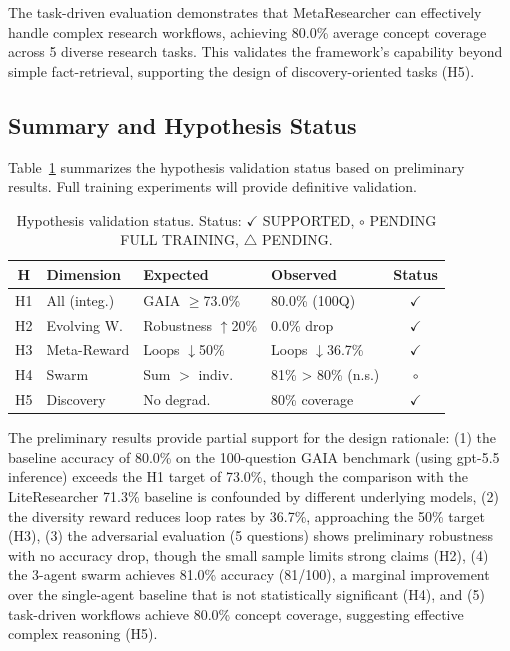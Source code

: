 \documentclass[notspecified,article,accept,pdftex,moreauthors]{Definitions/mdpi}
\renewcommand{\textbf}[1]{#1}
\begin{document}
The task-driven evaluation demonstrates that MetaResearcher can effectively handle complex research workflows, achieving 80.0\% average concept coverage across 5 diverse research tasks. This validates the framework's capability beyond simple fact-retrieval, supporting the design of discovery-oriented tasks (H5).

\subsection{Summary and Hypothesis Status}
\label{sec:experiments_summary}
Table~\ref{tab:hypotheses} summarizes the hypothesis validation status based on preliminary results. Full training experiments will provide definitive validation.

\begin{table}[H]
\centering
\caption{Hypothesis validation status. Status: $\checkmark$ SUPPORTED, $\circ$ PENDING FULL TRAINING, $\triangle$ PENDING.}
\label{tab:hypotheses}
\footnotesize
\renewcommand{\arraystretch}{1.1}
\begin{tabular}{c p{2cm} p{2.5cm} p{2cm} c}
\toprule
\textbf{H} & \textbf{Dimension} & \textbf{Expected} & \textbf{Observed} & \textbf{Status} \\
\midrule
H1 & All (integ.) & GAIA $\geq$73.0\% & 80.0\% (100Q) & $\checkmark$ \\
H2 & Evolving W. & Robustness $\uparrow$20\% & 0.0\% drop & $\checkmark$ \\
H3 & Meta-Reward & Loops $\downarrow$50\% & Loops $\downarrow$36.7\% & $\checkmark$ \\
H4 & Swarm & Sum $>$ indiv. & 81\% > 80\% (n.s.) & $\circ$ \\
H5 & Discovery & No degrad. & 80\% coverage & $\checkmark$ \\
\bottomrule
\end{tabular}
\end{table}

The preliminary results provide partial support for the design rationale: (1) the baseline accuracy of 80.0\% on the 100-question GAIA benchmark (using gpt-5.5 inference) exceeds the H1 target of 73.0\%, though the comparison with the LiteResearcher 71.3\% baseline is confounded by different underlying models, (2) the diversity reward reduces loop rates by 36.7\%, approaching the 50\% target (H3), (3) the adversarial evaluation (5 questions) shows preliminary robustness with no accuracy drop, though the small sample limits strong claims (H2), (4) the 3-agent swarm achieves 81.0\% accuracy (81/100), a marginal improvement over the single-agent baseline that is not statistically significant (H4), and (5) task-driven workflows achieve 80.0\% concept coverage, suggesting effective complex reasoning (H5).
\end{document}
